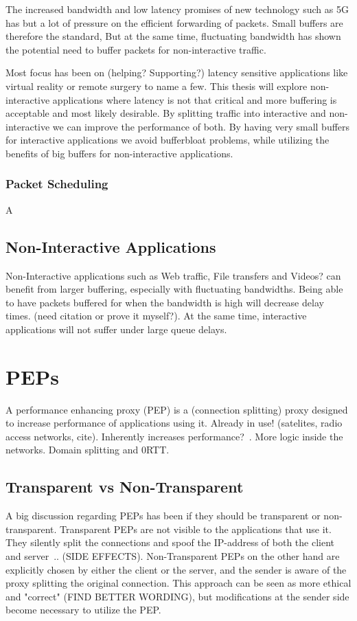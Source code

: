 \documentclass[a4paper,english, 11pt]{report}
\begin{document}
The increased bandwidth and low latency promises of new technology such as 5G has but a lot of pressure on the efficient forwarding of packets. Small buffers are therefore the standard, But at the same time, fluctuating bandwidth has shown the potential need to buffer packets for non-interactive traffic.

Most focus has been on (helping? Supporting?) latency sensitive applications like virtual reality or remote surgery to name a few. This thesis will explore non-interactive applications where latency is not that critical and more buffering is acceptable and most likely desirable. By splitting traffic into interactive and non-interactive we can improve the performance of both. By having very small buffers for interactive applications we avoid bufferbloat problems, while utilizing the benefits of big buffers for non-interactive applications.\\

\subsubsection{Packet Scheduling}
A

\subsection{Non-Interactive Applications}
Non-Interactive applications such as Web traffic, File transfers and Videos? can benefit from larger buffering, especially with fluctuating bandwidths. Being able to have packets buffered for when the bandwidth is high will decrease delay times. (need citation or prove it myself?). At the same time, interactive applications will not suffer under large queue delays.

\section{PEPs}
A performance enhancing proxy (PEP) is a (connection splitting) proxy designed to increase performance of applications using it. Already in use! (satelites, radio access networks, cite). Inherently increases performance?~\cite{tcp_mmwave_proxy}.
More logic inside the networks. Domain splitting and 0RTT.

\subsection{Transparent vs Non-Transparent}
A big discussion regarding PEPs has been if they should be transparent or non-transparent. Transparent PEPs are not visible to the applications that use it. They silently split the connections and spoof the IP-address of both the client and server~\cite{pep_dna}.. (SIDE EFFECTS). Non-Transparent PEPs on the other hand are explicitly chosen by either the client or the server, and the sender is aware of the proxy splitting the original connection. This approach can be seen as more ethical and "correct" (FIND BETTER WORDING), but modifications at the sender side become necessary to utilize the PEP.
\end{document}
